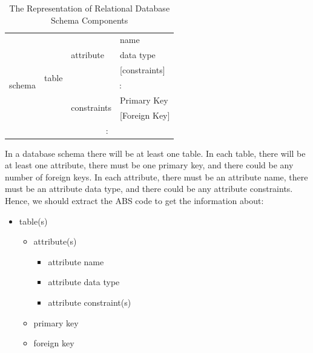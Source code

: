 \documentclass[runningheads,a4paper]{llncs}
\begin{document}
\begin{table}[]
	\centering
	\caption{ The Representation of Relational Database Schema Components}
	\label{my-label}
	\begin{tabular}{|l|l|l|l|}
		\hline
		\multirow{9}{*}{schema} & \multirow{7}{*}{table} & \multirow{3}{*}{attribute}   & name              \\ \cline{4-4} 
		&                        &                              & data type         \\ \cline{4-4} 
		&                        &                              & {[}constraints{]} \\ \cline{3-4} 
		&                        & \multicolumn{2}{c|}{\multirow{2}{*}{:}}          \\
		&                        & \multicolumn{2}{c|}{}                            \\ \cline{3-4} 
		&                        & \multirow{2}{*}{constraints} & Primary Key       \\ \cline{4-4} 
		&                        &                              & {[}Foreign Key{]} \\ \cline{2-4} 
		& \multicolumn{3}{c|}{\multirow{2}{*}{:}}                                   \\
		& \multicolumn{3}{c|}{}                                                     \\ \hline
	\end{tabular}
\end{table}

In a database schema there will be at least one table. In each table, there will be at least one attribute, there must be one primary key, and there could be any number of foreign keys. In each attribute, there must be an attribute name, there must be an attribute data type, and there could be any attribute constraints. Hence, we should extract the ABS code to get the information about:

\begin{itemize}
	\item table(s)
	\begin{itemize}	
		\item attribute(s)
			\begin{itemize}
				\item attribute name
				\item attribute data type
				\item attribute constraint(s)
			\end{itemize}
		\item primary key
		\item foreign key
	\end{itemize}
\end{itemize}
\end{document}
